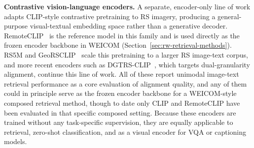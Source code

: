 \textbf{Contrastive vision-language encoders.} A separate, encoder-only line of work adapts CLIP-style contrastive pretraining to RS imagery, producing a general-purpose visual-textual embedding space rather than a generative decoder. RemoteCLIP~\cite{liu2024remoteclip} is the reference model in this family and is used directly as the frozen encoder backbone in WEICOM (Section~\ref{sec:rw-retrieval-methods}). RS5M and GeoRSCLIP~\cite{zhang2024rs5m} scale this pretraining to a larger RS image-text corpus, and more recent encoders such as DGTRS-CLIP~\cite{chen2025dgtrsddgtrsclipdualgranularity}, which targets dual-granularity alignment, continue this line of work. All of these report unimodal image-text retrieval performance as a core evaluation of alignment quality, and any of them could in principle serve as the frozen encoder backbone for a WEICOM-style composed retrieval method, though to date only CLIP and RemoteCLIP have been evaluated in that specific composed setting. Because these encoders are trained without any task-specific supervision, they are equally applicable to retrieval, zero-shot classification, and as a visual encoder for VQA or captioning models.

